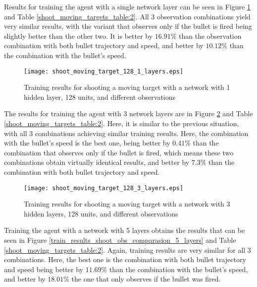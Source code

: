 Results for training the agent with a single network layer can be seen in Figure \ref{train_results_shoot_obs_comparasion_1_layers} and Table \ref{shoot_moving_targets_table:2}. All 3 observation combinations yield very similar results, with the variant that observes only if the bullet is fired being slightly better than the other two. It is better by $16.91\%$ than the observation combination with both bullet trajectory and speed, and better by $10.12\%$ than the combination with the bullet's speed.

\begin{figure}
    \begin{center}
        \texttt{[image: shoot\_moving\_target\_128\_1\_layers.eps]}
        \caption{Training results for shooting a moving target with a network with 1 hidden layer, 128 units, and different observations}
        \label{train_results_shoot_obs_comparasion_1_layers}
    \end{center}
\end{figure}

The results for training the agent with 3 network layers are in Figure \ref{train_results_shoot_obs_comparasion_3_layers} and Table \ref{shoot_moving_targets_table:2}. Here, it is similar to the previous situation, with all 3 combinations achieving similar training results. Here, the combination with the bullet's speed is the best one, being better by $0.41\%$ than the combination that observes only if the bullet is fired, which means these two combinations obtain virtually identical results, and better by $7.3\%$ than the combination with both bullet trajectory and speed.

\begin{figure}
    \begin{center}
        \texttt{[image: shoot\_moving\_target\_128\_3\_layers.eps]}
        \caption{Training results for shooting a moving target with a network with 3 hidden layers, 128 units, and different observations}
        \label{train_results_shoot_obs_comparasion_3_layers}
    \end{center}
\end{figure}

Training the agent with a network with 5 layers obtains the results that can be seen in Figure \ref{train_results_shoot_obs_comparasion_5_layers} and Table \ref{shoot_moving_targets_table:2}. Again, training results are very similar for all 3 combinations. Here, the best one is the combination with both bullet trajectory and speed being better by $11.69\%$ than the combination with the bullet's speed, and better by $18.01\%$ the one that only observes if the bullet was fired.


